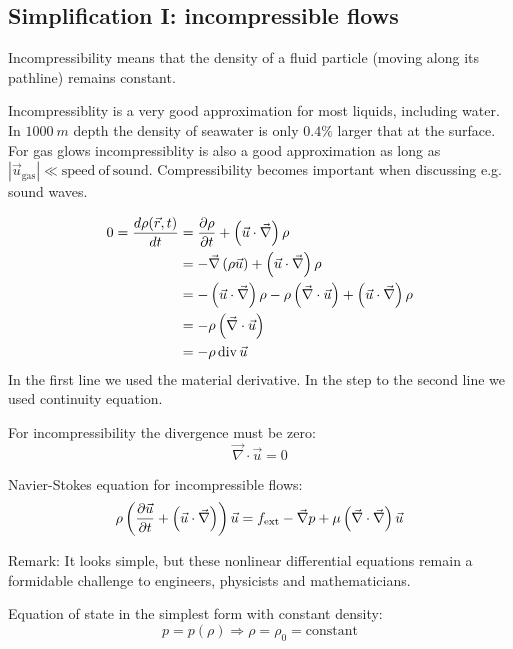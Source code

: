\subsection{Simplification I: incompressible flows}
Incompressibility means that the density of a fluid particle (moving along its pathline) remains constant.

Incompressiblity is a very good approximation for most liquids, including water. In $\SI{1000}{m}$ depth the density of seawater is only $0.4\%$ larger that at the surface. For gas glows incompressiblity is also a good approximation as long as $|\vec{u}_\mathrm{gas}| \ll \mathrm{speed\ of\ sound}$. Compressibility becomes important when discussing e.g. sound waves.

\begin{align}
0 = \frac{d \rho(\vec{r},t)}{d t} &= \frac{\partial \rho}{\partial t}+\left(\vec{u}\cdot\vec{\nabla}\right)\rho\\
&= -\vec{\nabla}\left(\rho\vec{u}\right)+\left(\vec{u}\cdot\vec{\nabla}\right)\rho \\
&= -\left(\vec{u}\cdot\vec{\nabla}\right)\rho - \rho\left(\vec{\nabla}\cdot\vec{u}\right) + \left(\vec{u}\cdot\vec{\nabla}\right)\rho\\
&= -\rho\left(\vec{\nabla}\cdot\vec{u}\right)\\
&= -\rho\, \mathrm{div}\, \vec{u}
\end{align}
In the first line we used the material derivative. In the step to the second line we used continuity equation.

For incompressibility the divergence must be zero:
\begin{equation}
\vec{\nabla}\cdot\vec{u} = 0
\end{equation}

Navier-Stokes equation for incompressible flows:
\begin{equation}
\rho\left(\frac{\partial \vec{u}}{\partial t}+\left(\vec{u}\cdot\vec{\nabla}\right)\right)\vec{u} = f_\mathrm{ext}-\vec{\nabla}p+\mu\left(\vec{\nabla}\cdot\vec{\nabla}\right)\vec{u}
\end{equation}
\begin{framed}
Remark: It looks simple, but these nonlinear differential equations remain a formidable challenge to engineers, physicists and mathematicians.
\end{framed}
Equation of state in the simplest form with constant density:
\begin{equation}
p=p(\rho) \Rightarrow \rho=\rho_0=\mathrm{constant}
\end{equation}


